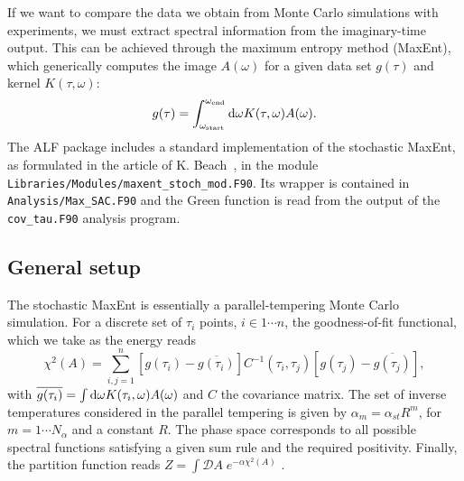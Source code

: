 

If we want to compare the data we obtain from Monte Carlo simulations with experiments, we must extract spectral information from the imaginary-time output.
This can be achieved through the maximum entropy method (MaxEnt), which generically computes the  image  $A(\omega) $ for a given  data  set $g(\tau) $  and kernel $K(\tau,\omega) $:
\begin{equation}
g(\tau) =  \int_{\omega_\mathrm{start}}^{\omega_\mathrm{end}} \mathrm{d}{\omega} K(\tau,\omega) A(\omega).
\end{equation} 
The  ALF package includes a standard implementation of the stochastic MaxEnt, as formulated in the article of K. Beach~\cite{Beach04a}, in the module \texttt{Libraries/Modules/\allowbreak{}maxent\_stoch\_mod.F90}. Its wrapper is contained in \texttt{Analysis/Max\_SAC.F90} and the Green function is read from the
output of the \texttt{cov\_tau.F90} analysis program.

\subsection{General setup}

The stochastic MaxEnt is essentially a parallel-tempering Monte Carlo simulation.  For a discrete set of $\tau_i$ points,  $i \in 1 \cdots n $, the goodness-of-fit functional, which we take as the energy reads
\begin{equation}
  \chi^{2}(A) =  \sum_{i,j=1}^{n}   \left[ g(\tau_i)  -  \overline{g(\tau_i)} \right] C^{-1}(\tau_i,\tau_j) \left[    g(\tau_j)  -  \overline{g(\tau_j)} \right] ,
\end{equation}
with $ \overline{g(\tau_i)} =\int \mathrm{d}{\omega} K(\tau_{i},\omega)  A(\omega)$ and  $C$ the covariance matrix. 
The set of inverse temperatures considered in the parallel tempering is given by
$ \alpha_m = \alpha_{st}  R^{m}$, for $m = 1 \cdots N_{\alpha} $ and a constant $R$. The phase space corresponds to all possible spectral functions satisfying a given sum rule and the required positivity.  Finally, the partition function reads
$Z =  \int\mathcal{D}\!A\; e^{-\alpha \chi^{2}(A)}$ \cite{Beach04a}.


